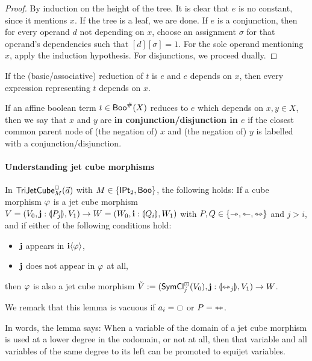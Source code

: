 \documentclass[a4paper]{article}
\begin{document}
\begin{proof}
	By induction on the height of the tree.
	It is clear that $e$ is no constant, since it mentions $x$.
	If the tree is a leaf, we are done.
	If $e$ is a conjunction, then for every operand $d$ not depending on $x$, choose an assignment $\sigma$ for that operand's dependencies such that $[d][\sigma] = 1$.
	For the sole operand mentioning $x$, apply the induction hypothesis.
	For disjunctions, we proceed dually.
\end{proof}
\begin{corollary} \label{thm:reduction-minimal-deps}
	If the (basic/associative) reduction of $t$ is $e$ and $e$ depends on $x$, then every expression representing $t$ depends on $x$. \qedhere
\end{corollary}
\begin{definition} \label{def:in-connection}
	If an affine boolean term $t \in \mathsf{Boo}^\#(X)$ reduces to $e$ which depends on $x, y \in X$, then we say that $x$ and $y$ are \textbf{in conjunction/disjunction in $e$} if the closest common parent node of (the negation of) $x$ and (the negation of) $y$ is labelled with a conjunction/disjunction.
\end{definition}

\paragraph{Understanding jet cube morphisms}
\begin{lemma} \label{thm:left-of-concursor}
	In $\mathsf{TriJetCube}^{\Box}_{M}\mathopen{}\left( \vec a \right)\mathclose{}$ with $M \in \mathopen{}\left\{ {\mathsf{IPt}_2}, \mathsf{Boo} \right\}\mathclose{}$,
	the following holds:
	If a cube morphism $\varphi$ is a jet cube morphism $V = (V_0, \mathbf{j} : {\llparenthesis P_j \rrparenthesis}, V_1) \to W = (W_0, \mathbf{i} : {\llparenthesis Q_i \rrparenthesis}, W_1)$ with $P, Q \in \mathopen{}\left\{ \rightarrowtriangle, \leftarrowtriangle, \leftrightarrowtriangle \right\}\mathclose{}$ and $j > i$,
	and if either of the following conditions hold:
	\begin{itemize}
		\item $\mathbf{j}$ appears in $\mathbf{i} \langle \varphi \rangle$,
		\item $\mathbf{j}$ does not appear in $\varphi$ at all,
	\end{itemize}
	then $\varphi$ is also a jet cube morphism
	$\tilde V := (\mathsf{SymCl}^\boxdot_j(V_0), \mathbf{j} : {\llparenthesis \leftrightarrowtriangle_j \rrparenthesis}, V_1) \to W$.
\end{lemma}
We remark that this lemma is vacuous if $a_i = \npolar$ or $P = {\leftrightarrowtriangle}$.

In words, the lemma says: When a variable of the domain of a jet cube morphism is used at a lower degree in the codomain, or not at all, then that variable and all variables of the same degree to its left can be promoted to equijet variables.
\end{document}
